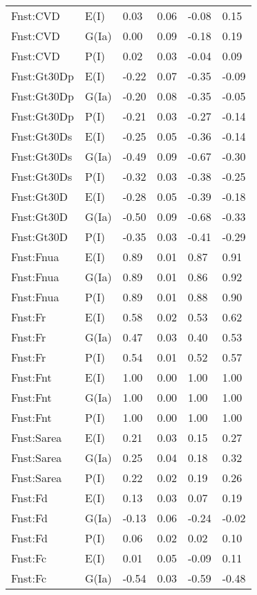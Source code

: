 \begin{center}
\begin{longtable}{|p{1.1in}|p{0.7in}|p{0.7in}|p{0.6in}|p{0.6in}|p{0.6in}|}
  Fnst:CVD & E(I) & 0.03 & 0.06 & -0.08 & 0.15 \\ 
  Fnst:CVD & G(Ia) & 0.00 & 0.09 & -0.18 & 0.19 \\ 
  Fnst:CVD & P(I) & 0.02 & 0.03 & -0.04 & 0.09 \\ 
  Fnst:Gt30Dp & E(I) & -0.22 & 0.07 & -0.35 & -0.09 \\ 
  Fnst:Gt30Dp & G(Ia) & -0.20 & 0.08 & -0.35 & -0.05 \\ 
  Fnst:Gt30Dp & P(I) & -0.21 & 0.03 & -0.27 & -0.14 \\ 
  Fnst:Gt30Ds & E(I) & -0.25 & 0.05 & -0.36 & -0.14 \\ 
  Fnst:Gt30Ds & G(Ia) & -0.49 & 0.09 & -0.67 & -0.30 \\ 
  Fnst:Gt30Ds & P(I) & -0.32 & 0.03 & -0.38 & -0.25 \\ 
  Fnst:Gt30D & E(I) & -0.28 & 0.05 & -0.39 & -0.18 \\ 
  Fnst:Gt30D & G(Ia) & -0.50 & 0.09 & -0.68 & -0.33 \\ 
  Fnst:Gt30D & P(I) & -0.35 & 0.03 & -0.41 & -0.29 \\ 
  Fnst:Fnua & E(I) & 0.89 & 0.01 & 0.87 & 0.91 \\ 
  Fnst:Fnua & G(Ia) & 0.89 & 0.01 & 0.86 & 0.92 \\ 
  Fnst:Fnua & P(I) & 0.89 & 0.01 & 0.88 & 0.90 \\ 
  Fnst:Fr & E(I) & 0.58 & 0.02 & 0.53 & 0.62 \\ 
  Fnst:Fr & G(Ia) & 0.47 & 0.03 & 0.40 & 0.53 \\ 
  Fnst:Fr & P(I) & 0.54 & 0.01 & 0.52 & 0.57 \\ 
  Fnst:Fnt & E(I) & 1.00 & 0.00 & 1.00 & 1.00 \\ 
  Fnst:Fnt & G(Ia) & 1.00 & 0.00 & 1.00 & 1.00 \\ 
  Fnst:Fnt & P(I) & 1.00 & 0.00 & 1.00 & 1.00 \\ 
  Fnst:Sarea & E(I) & 0.21 & 0.03 & 0.15 & 0.27 \\ 
  Fnst:Sarea & G(Ia) & 0.25 & 0.04 & 0.18 & 0.32 \\ 
  Fnst:Sarea & P(I) & 0.22 & 0.02 & 0.19 & 0.26 \\ 
  Fnst:Fd & E(I) & 0.13 & 0.03 & 0.07 & 0.19 \\ 
  Fnst:Fd & G(Ia) & -0.13 & 0.06 & -0.24 & -0.02 \\ 
  Fnst:Fd & P(I) & 0.06 & 0.02 & 0.02 & 0.10 \\ 
  Fnst:Fc & E(I) & 0.01 & 0.05 & -0.09 & 0.11 \\ 
  Fnst:Fc & G(Ia) & -0.54 & 0.03 & -0.59 & -0.48 \\ 

\end{longtable}
\end{center}
